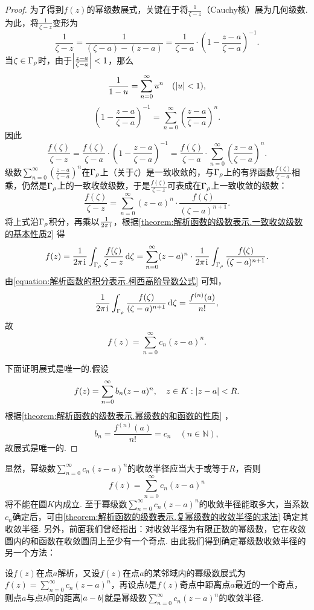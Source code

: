 \begin{theorem}
\begin{proof}
为了得到\(f(z)\)的幂级数展式，关键在于将\(\frac{1}{\zeta-z}\)（Cauchy核）展为几何级数.为此，将\(\frac{1}{\zeta-z}\)变形为\[
\frac{1}{\zeta-z}
= \frac{1}{(\zeta-a)-(z-a)}
= \frac{1}{\zeta-a} \cdot \left(1 - \frac{z-a}{\zeta-a}\right)^{-1}.
\]当\(\zeta \in \Gamma_{\rho}\)时，由于\(\abs{\frac{z-a}{\zeta-a}}<1\)，那么\[
\frac{1}{1-u} = \sum\limits_{n=0}^{\infty} u^n
\quad(\abs{u}<1),
\]\[
\left(1 - \frac{z-a}{\zeta-a}\right)^{-1}
= \sum\limits_{n=0}^{\infty} \left(\frac{z-a}{\zeta-a}\right)^n.
\]因此\[
\frac{f(\zeta)}{\zeta-z}
= \frac{f(\zeta)}{\zeta-a} \cdot \left(1 - \frac{z-a}{\zeta-a}\right)^{-1}
= \frac{f(\zeta)}{\zeta-a} \cdot \sum\limits_{n=0}^{\infty} \left(\frac{z-a}{\zeta-a}\right)^n.
\]级数\(\sum\limits_{n=0}^{\infty} \left(\frac{z-a}{\zeta-a}\right)^n\)在\(\Gamma_{\rho}\)上（关于\(\zeta\)）是一致收敛的，与\(\Gamma_{\rho}\)上的有界函数\(\frac{f(\zeta)}{\zeta-a}\)相乘，仍然是\(\Gamma_{\rho}\)上的一致收敛级数，于是\(\frac{f(\zeta)}{\zeta-z}\)可表成在\(\Gamma_{\rho}\)上一致收敛的级数：\[
\frac{f(\zeta)}{\zeta-z}
= \sum\limits_{n=0}^{\infty} (z-a)^n \cdot \frac{f(\zeta)}{(\zeta-a)^{n+1}}.
\]将上式沿\(\Gamma_{\rho}\)积分，再乘以\(\frac{1}{2\pi\kern1pt\mathrm{i}\kern1pt}\)，根据\cref{theorem:解析函数的级数表示.一致收敛级数的基本性质2} 得\[
f(z) = \frac{1}{2\pi\kern1pt\mathrm{i}\kern1pt} \int_{\Gamma_{\rho}} \frac{f(\zeta)}{\zeta-z} \dd{\zeta}
= \sum\limits_{n=0}^{\infty} (z-a)^n \cdot \frac{1}{2\pi\kern1pt\mathrm{i}\kern1pt} \int_{\Gamma_{\rho}} \frac{f(\zeta)}{(\zeta-a)^{n+1}}.
\]由\cref{equation:解析函数的积分表示.柯西高阶导数公式} 可知，\[
\frac{1}{2\pi\kern1pt\mathrm{i}\kern1pt} \int_{\Gamma_{\rho}} \frac{f(\zeta)}{(\zeta-a)^{n+1}} \dd{\zeta}
= \frac{f^{(n)}(a)}{n!},
\]故\[
f(z) = \sum\limits_{n=0}^{\infty} c_n (z-a)^n.
\]

下面证明展式是唯一的.假设\[
f(z) = \sum\limits_{n=0}^{\infty} b_n (z-a)^n,
\quad z \in K: \abs{z-a}<R.
\]根据\cref{theorem:解析函数的级数表示.幂级数的和函数的性质} ，\[
b_n = \frac{f^{(n)}(a)}{n!} = c_n \quad (n\in\mathbb{N}),
\]故展式是唯一的.
\end{proof}
\end{theorem}
显然，幂级数\(\sum\limits_{n=0}^{\infty} c_n (z-a)^n\)的收敛半径应当大于或等于\(R\)，否则\[
f(z) = \sum\limits_{n=0}^{\infty} c_n (z-a)^n
\]将不能在圆\(K\)内成立.
至于幂级数\(\sum\limits_{n=0}^{\infty} c_n (z-a)^n\)的收敛半径能取多大，当系数\(c_n\)确定后，可由\cref{theorem:解析函数的级数表示.复幂级数的收敛半径的求法} 确定其收敛半径.
另外，前面我们曾经指出：对收敛半径为有限正数的幂级数，它在收敛圆内的和函数在收敛圆周上至少有一个奇点.
由此我们得到确定幂级数收敛半径的另一个方法：

设\(f(z)\)在点\(a\)解析，又设\(f(z)\)在点\(a\)的某邻域内的幂级数展式为\(f(z) = \sum\limits_{n=0}^{\infty} c_n (z-a)^n\)，再设点\(b\)是\(f(z)\)奇点中距离点\(a\)最近的一个奇点，则点\(a\)与点\(b\)间的距离\(\abs{a-b}\)就是幂级数\(\sum\limits_{n=0}^{\infty} c_n (z-a)^n\)的收敛半径.

